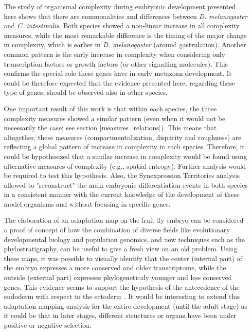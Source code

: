 
The study of organismal complexity during embryonic development presented here shows that there are commonalities and differences between \textit{D. melanogaster} and \textit{C. intestinalis}. Both species showed a non-linear increase in all complexity measures, while the most remarkable difference is the timing of the major change in complexity, which is earlier in \textit{D. melanogaster} (around gastrulation).
Another common pattern is the early increase in complexity when considering only transcription factors or growth factors (or other signalling molecules). This confirms the special role these genes have in early metazoan development. It could be therefore expected that the evidence presented here, regarding these type of genes, should be observed also in other species. 

One important result of this work is that within each species, the three complexity measures showed a similar pattern (even when it would not be necessarily the case; see section \ref{measures_relations}). This means that altogether, these measures (compartmentalization, disparity and roughness) are reflecting a global pattern of increase in complexity in each species. Therefore, it could be hypothesized that a similar increase in complexity would be found using alternative measures of complexity (e.g., spatial entropy). Further analysis would be required to test this hypothesis.
Also, the Synexpression Territories analysis allowed to "reconstruct" the main embryonic differentiation events in both species in a consistent manner with the current knowledge of the development of these model organisms and without focusing in specific genes.

The elaboration of an adaptation map on the fruit fly embryo can be considered a proof of concept of how the combination of diverse fields like evolutionary developmental biology and population genomics, and new techniques such as the phylostratigraphy, can be useful to give a fresh view on an old problem.
Using these maps, it was possible to visually identify that the center (internal part) of the embryo expresses a more conserved and older transcriptome, while the outside (external part) expresses phylogeneticaly younger and less conserved genes. This evidence seems to support the hypothesis of the antecedence of the endoderm with respect to the ectoderm \citep{Hashimshony2014}. It would be interesting to extend this adaptation mapping analysis for the entire development (until the adult stage) as it could be that in later stages, different structures or organs have been under positive or negative selection.

